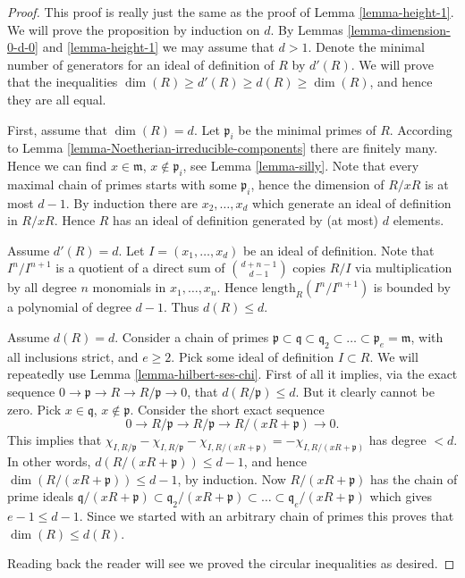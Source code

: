 \begin{proof}
This proof is really just the same as the proof of Lemma
\ref{lemma-height-1}. We will prove the proposition by induction
on $d$. By Lemmas \ref{lemma-dimension-0-d-0} and \ref{lemma-height-1}
we may assume that $d > 1$. Denote the minimal number of
generators for an ideal of definition of $R$ by $d'(R)$.
We will prove that the inequalities
$\dim(R) \geq d'(R) \geq d(R) \geq \dim(R)$,
and hence they are all equal.

\medskip\noindent
First, assume that $\dim(R) = d$.
Let $\mathfrak p_i$ be the minimal primes of $R$.
According to Lemma \ref{lemma-Noetherian-irreducible-components}
there are finitely many. Hence we can find $x \in \mathfrak m$,
$x \not \in \mathfrak p_i$, see Lemma \ref{lemma-silly}.
Note that every maximal chain of primes starts with some $\mathfrak p_i$,
hence the dimension of $R/xR$ is at most $d-1$. By induction
there are $x_2, \ldots, x_d$ which generate an ideal of definition
in $R/xR$. Hence $R$ has an ideal of definition generated
by (at most) $d$ elements.

\medskip\noindent
Assume $d'(R) = d$. Let $I = (x_1, \ldots, x_d)$ be an ideal
of definition. Note that $I^n/I^{n + 1}$ is a quotient of a direct
sum of $\binom{d + n - 1}{d - 1}$ copies $R/I$ via multiplication
by all degree $n$ monomials in $x_1, \ldots, x_n$.
Hence $\text{length}_R(I^n/I^{n + 1})$ is bounded by a polynomial
of degree $d-1$. Thus $d(R) \leq d$.

\medskip\noindent
Assume $d(R) = d$. Consider a chain of primes
$\mathfrak p \subset \mathfrak q \subset
\mathfrak q_2 \subset \ldots \subset \mathfrak p_e = \mathfrak m$,
with all inclusions strict, and $e \geq 2$.
Pick some ideal of definition $I \subset R$.
We will repeatedly use
Lemma \ref{lemma-hilbert-ses-chi}. First of all
it implies, via the exact sequence
$0 \to \mathfrak p \to R \to R/\mathfrak p \to 0$,
that $d(R/\mathfrak p) \leq d$. But it clearly cannot
be zero. Pick $x\in \mathfrak q$, $x\not \in \mathfrak p$.
Consider the short exact sequence
$$
0 \to R/\mathfrak p \to R/\mathfrak p \to R/(xR + \mathfrak p) \to 0.
$$
This implies that $\chi_{I, R/\mathfrak p} - \chi_{I, R/\mathfrak p}
- \chi_{I, R/(xR + \mathfrak p)} = - \chi_{I, R/(xR + \mathfrak p)}$
has degree $ < d$. In other words, $d(R/(xR + \mathfrak p)) \leq d - 1$,
and hence $\dim(R/(xR + \mathfrak p)) \leq d - 1$, by
induction. Now $R/(xR + \mathfrak p)$ has the chain of prime ideals
$\mathfrak q/(xR + \mathfrak p) \subset \mathfrak q_2/(xR + \mathfrak p)
\subset \ldots \subset \mathfrak q_e/(xR + \mathfrak p)$ which gives
$e - 1 \leq d - 1$. Since we started with an arbitrary chain of
primes this proves that $\dim(R) \leq d(R)$.

\medskip\noindent
Reading back the reader will see we proved the circular
inequalities as desired.
\end{proof}

